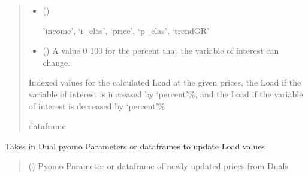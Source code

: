 \documentclass[letterpaper,10pt,english]{sphinxmanual}
\begin{document}
\begin{fulllineitems}
\begin{fulllineitems}
\begin{quote}
\begin{description}
\begin{itemize}
\item {} 
\sphinxAtStartPar
{} () \textendash{} \begin{description}
\sphinxAtStartPar
’income’, ‘i\_elas’, ‘price’, ‘p\_elas’, ‘trendGR’

\end{description}


\item {} 
\sphinxAtStartPar
{} () \textendash{} A value 0 \sphinxhyphen{} 100 for the percent that the variable of interest can change.

\end{itemize}

\sphinxAtStartPar
Indexed values for the calculated Load at the given prices, the Load if the variable of
interest is increased by ‘percent’\%, and the Load if the variable of interest is
decreased by ‘percent’\%

\sphinxAtStartPar
dataframe

\end{description}\end{quote}

\end{fulllineitems}


\begin{fulllineitems}
\label{\detokenize{src.models.residential.scripts.residential:src.models.residential.scripts.residential.residentialModule.update_load}}
\pysigstartsignatures
\pysiglinewithargsret
{}
{}
{}
\pysigstopsignatures
\sphinxAtStartPar
Takes in Dual pyomo Parameters or dataframes to update Load values
\begin{quote}\begin{description}
\sphinxAtStartPar
{} () \textendash{} Pyomo Parameter or dataframe of newly updated prices from Duals


\end{description}
\end{quote}
\end{fulllineitems}
\end{fulllineitems}
\end{document}
